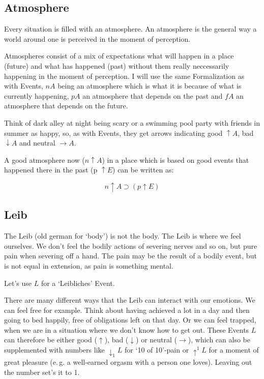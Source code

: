 \documentclass{scrartcl}
\begin{document}
\subsection{Atmosphere}

Every situation is filled with an atmosphere. An atmosphere is the general way a world around one is perceived in the moment of perception.

Atmospheres consist of a mix of expectations what will happen in a place (future) and what has happened (past) without them
really neccessarily happening in the moment of perception. I will use the same Formalization as with Events,
$n A$ being an atmosphere which is what it is because of what is currently happening, $p A$ an atmosphere that
depends on the past and $f A$ an atmosphere that depends on the future.

Think of dark alley at night being scary or a swimming pool party with friends
in summer as happy, so, as with Events, they get arrows indicating good $\uparrow A$, bad $\downarrow A$ and neutral $\rightarrow A$.

A good atmosphere now ($n\uparrow A$) in a place which is based on good events that happened there in the past (p $\uparrow E$)  can be written as:

\begin{equation}n\uparrow A \supset \left(
			p \uparrow E
	\right)
\end{equation}

\subsection{Leib}

The Leib (old german for `body') is not the body. The Leib is where we feel ourselves. We don't feel the bodily actions of severing
nerves and so on, but pure pain when severing off a hand. The pain may be the result of a bodily event, but is not equal in extension,
as pain is something mental. 

Let's use $L$ for a `Leibliches' Event. 

There are many different ways that the Leib can interact with our emotions. We can feel free for example. Think about having achieved
a lot in a day and then going to bed happily, free of obligations left on that day. Or we can feel trapped, when we are in a situation
where we don't know how to get out. These Events $L$ can therefore be either good ($\uparrow$), bad ($\downarrow$) or neutral ($\rightarrow$),
which can also be supplemented with numbers like $\downarrow_1 L$ for `10 of 10'-pain or $\uparrow^1 L$ for a moment of great pleasure
(e.\,g. a well-earned orgasm with a person one loves). Leaving out the number set's it to 1.
\end{document}

